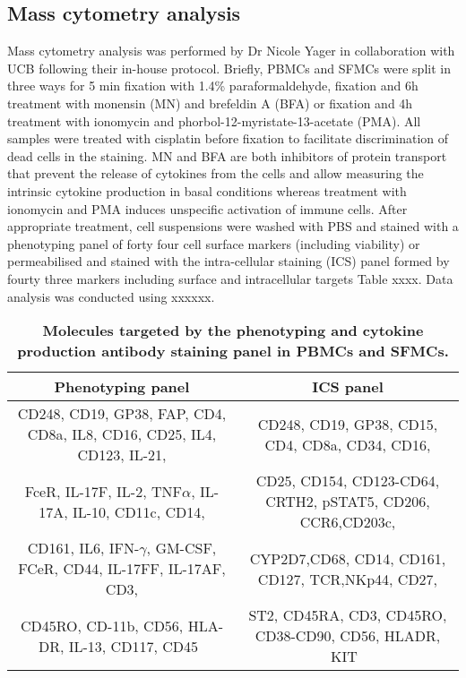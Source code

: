 \subsection{Mass cytometry analysis}

Mass cytometry analysis was performed by Dr Nicole Yager in collaboration with UCB following their in-house protocol. Briefly, PBMCs and SFMCs
were split in three ways for 5 min fixation with 1.4\% paraformaldehyde, fixation and 6h treatment with monensin (MN) and brefeldin A (BFA) or fixation and 4h treatment with ionomycin and phorbol-12-myristate-13-acetate (PMA). All samples were treated with cisplatin before fixation to facilitate discrimination of dead cells in the staining. MN and BFA are both inhibitors of protein transport
that prevent the release of cytokines from the cells and allow measuring the intrinsic cytokine production in basal conditions whereas treatment with ionomycin and PMA induces unspecific activation of immune cells. After appropriate treatment, cell suspensions were washed with PBS and stained with a phenotyping panel of forty four cell surface markers (including viability) or permeabilised and stained with the intra-cellular staining (ICS) panel formed by fourty three markers including surface and intracellular targets Table xxxx. Data analysis was conducted using xxxxxx.  

\begin{table}[htbp]
\setlength{\tabcolsep}{20pt}
\renewcommand{\arraystretch}{1.5}
\begin{tabular}{@{} c c }
\toprule
\textbf{Phenotyping panel} & \textbf{ICS panel} \\
\midrule
CD248, CD19, GP38, FAP, CD4, CD8a, IL8, CD16, CD25, IL4, CD123, IL-21,& CD248, CD19, GP38, CD15, CD4, CD8a, CD34, CD16,\\
FceR, IL-17F, IL-2, TNF$\alpha$, IL-17A, IL-10, CD11c, CD14, &CD25, CD154, CD123-CD64, CRTH2, pSTAT5, CD206, CCR6,CD203c,\\  
CD161, IL6, IFN-$\gamma$, GM-CSF, FCeR, CD44, IL-17FF, IL-17AF, CD3, & CYP2D7,CD68, CD14, CD161, CD127, TCR,NKp44, CD27, \\
CD45RO, CD-11b, CD56, HLA-DR, IL-13, CD117, CD45 &  ST2, CD45RA, CD3, CD45RO, CD38-CD90, CD56, HLADR, KIT \\
\bottomrule
\end{tabular}
\medskip %
\caption[Molecules targeted by the phenotyping and cytokine production antibody staining panel in PBMCs and SFMCs.]{\textbf{Molecules targeted by the phenotyping and cytokine production antibody staining panel in PBMCs and SFMCs.}}
\label{tab:CyTOF}
\end{table}
\bigskip %



